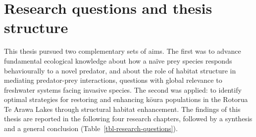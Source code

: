 \documentclass[
  12pt,
  a4paper,
  oneside]{scrbook}
\begin{document}
\section{Research questions and thesis
structure}\label{research-questions-and-thesis-structure}

This thesis pursued two complementary sets of aims. The first was to
advance fundamental ecological knowledge about how a naïve prey species
responds behaviourally to a novel predator, and about the role of
habitat structure in mediating predator-prey interactions, questions
with global relevance to freshwater systems facing invasive species. The
second was applied: to identify optimal strategies for restoring and
enhancing kōura populations in the Rotorua Te Arawa Lakes through
structural habitat enhancement. The findings of this thesis are reported
in the following four research chapters, followed by a synthesis and a
general conclusion (Table~\ref{tbl-research-questions}).
\end{document}
